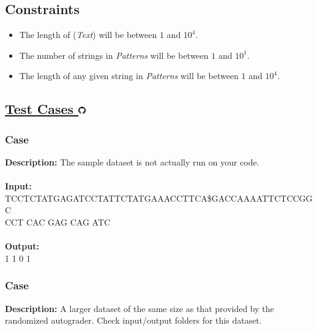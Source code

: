 \documentclass{article}
\renewcommand{\sc}[1]{\text{\scshape #1}}
\newcommand{\code}[1]{{\fontfamily{pcr}\selectfont #1}}
\newcommand{\gitlogo}{\includegraphics[height=12.5]{c0/gitlogo.png}}
\begin{document}
\subsection*{Constraints}
\begin{itemize}
    \item The length of \sc{BWT}(\emph{Text}) will be between $1$ and $10^4$.
    \item The number of strings in \emph{Patterns} will be between $1$ and $10^1$.
    \item The length of any given string in \emph{Patterns} will be between $1$ and $10^4$.
\end{itemize}
\pagebreak

\subsection*{\href{https://github.com/rjeveloff/BA_problemregister/tree/main/test_cases/chapter_9/9L}{Test Cases \gitlogo}}
\subsubsection*{Case }
\hline \vspace{5}
\textbf{Description:} The sample dataset is not actually run on your code.\\ \\
\noindent \textbf{Input:}\\
\code{TCCTCTATGAGATCCTATTCTATGAAACCTTCA\$GACCAAAATTCTCCGGC\\CCT CAC GAG CAG ATC}\\ \\
\noindent \textbf{Output:}\\
\code{2 1 1 0 1}

\subsubsection*{Case }
\hline \vspace{5}
\textbf{Description:} A larger dataset of the same size as that provided by the randomized autograder. Check input/output folders for this dataset.\\ \\
\pagebreak
\end{document}
